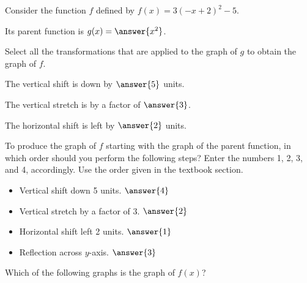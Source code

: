 \documentclass{ximera}
\author{Kenneth Berglund}
\begin{document}
\begin{exercise}
Consider the function $f$ defined by $f(x) = 3(-x + 2)^2 - 5$.

Its parent function is $g(x) = \answer{x^2}$. 

\begin{exercise}
Select all the transformations that are applied to the graph of $g$ to obtain the graph of $f$.
\begin{selectAll}
\end{selectAll}

\begin{exercise}
The vertical shift is down by $\answer{5}$ units.

The vertical stretch is by a factor of $\answer{3}$.

The horizontal shift is left by $\answer{2}$ units.

\begin{exercise}
To produce the graph of $f$ starting with the graph of the parent function, in which order should you perform the following steps? Enter the numbers 1, 2, 3, and 4, accordingly. Use the order given in the textbook section.
\begin{itemize}
\item Vertical shift down 5 units. $\answer{4}$
\item Vertical stretch by a factor of 3. $\answer{2}$
\item Horizontal shift left 2 units. $\answer{1}$
\item Reflection across $y$-axis. $\answer{3}$
\end{itemize}
Which of the following graphs is the graph of $f(x)$?


\end{exercise}
\end{exercise}
\end{exercise}
\end{exercise}
\end{document}
